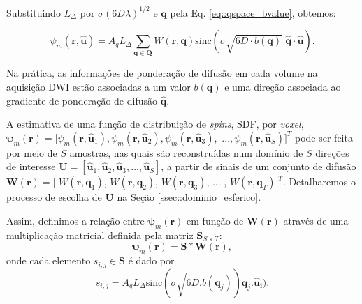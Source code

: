 \documentclass[
    12pt,                %
    oneside,            %
    a4paper,            %
    english,            %
    french,                %
    spanish,            %
    brazil                %
    ]{abntex2}
\begin{document}
Substituindo $L_{\Delta}$ por $\sigma(6D\lambda)^{1/2}$ e $\mathbf{q}$ pela Eq. \ref{eq::qspace_bvalue}, obtemos:



\begin{equation}
\label{eq::sdf_discrete_2}
    \psi_m(\mathbf{r}, \mathbf{\hat{u}}) =
    A_qL_{\Delta}\sum_{\mathbf{q} \in \mathbf{Q}}W(\mathbf{r}, \mathbf{q})\text{sinc}(\sigma \sqrt{6D\cdot b(\mathbf{q})}\,\,  \mathbf{\hat{q}}\cdot\mathbf{\hat{u}}) .
\end{equation}

 Na prática, as informações de ponderação de difusão em cada volume na aquisição DWI estão associadas a um valor $b(\mathbf{q})$ e uma direção associada ao gradiente de ponderação de difusão $\mathbf{\hat{q}}$.%

A estimativa de uma função de distribuição de \textit{spins}, SDF, por \textit{voxel}, 
$\boldsymbol{\psi}_m(\mathbf{r}) = [
\psi_m(\mathbf{r}, \mathbf{\hat{u}}_1), 
\psi_m(\mathbf{r}, \mathbf{\hat{u}}_2), 
\psi_m(\mathbf{r}, \mathbf{\hat{u}}_3),$
$ ..., 
\psi_m(\mathbf{r}, \mathbf{\hat{u}}_S)
]^T$
pode ser feita por meio de $S$ amostras, nas quais são reconstruídas num domínio de $S$ direções de interesse $\mathbf{U} = [
\mathbf{\hat{u}}_1, 
\mathbf{\hat{u}}_2, 
\mathbf{\hat{u}}_3, \dots, 
\mathbf{\hat{u}}_S 
]$, a partir de sinais de um conjunto de difusão $\mathbf{W}(\mathbf{r}) = [$
$W(\mathbf{r},\mathbf{q}_1)$,
$W(\mathbf{r},\mathbf{q}_2)$,
$W(\mathbf{r},\mathbf{q}_3)$, $\dots$ ,
$W(\mathbf{r},\mathbf{q}_T)
]^T$. Detalharemos o processo de escolha de $\mathbf{U}$ na Seção \ref{ssec::dominio_esferico}.

Assim, definimos a relação entre $\boldsymbol{\psi}_m(\mathbf{r})$ em função de $\mathbf{W}(\mathbf{r})$ através de uma multiplicação matricial definida pela matriz $\mathbf{S}_{S\times T}$:
\begin{equation}
\label{eq::gqi_vec}
    \boldsymbol{\psi}_m(\mathbf{r}) = \mathbf{S}*\mathbf{W}(\mathbf{r}) ,
\end{equation}
onde cada elemento $s_{i,j} \in \mathbf{S}$ é dado por
\begin{equation}
\label{eq::s_ij}
s_{i,j} = A_qL_{\Delta}\text{sinc}(\sigma \sqrt{6D.b(\mathbf{q}_j)} )\mathbf{\hat{q}}_j.\mathbf{\hat{u}_i}) .
\end{equation}
\end{document}
